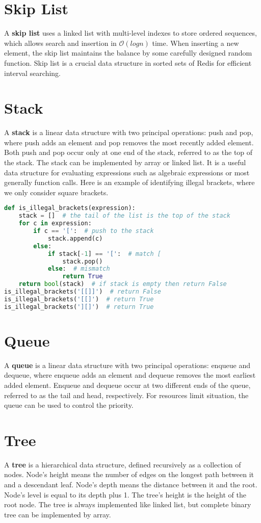 \documentclass[a4paper,11pt]{article}
\begin{document}
\section*{Skip List}
A \textbf{skip list} uses a linked list with multi-level indexes to store ordered sequences, which allows search and insertion in $\mathcal{O}(logn)$ time.
When inserting a new element, the skip list maintains the balance by some carefully designed random function.
Skip list is a crucial data structure in sorted sets of Redis for efficient interval searching.


\section*{Stack}
A \textbf{stack} is a linear data structure with two principal operations: push and pop,
where push adds an element and pop removes the most recently added element.
Both push and pop occur only at one end of the stack, referred to as the top of the stack.
The stack can be implemented by array or linked list. 
It is a useful data structure for evaluating expressions such as algebraic expressions or most generally function calls.
Here is an example of identifying illegal brackets, where we only consider square brackets.
\begin{lstlisting}[language=Python]
def is_illegal_brackets(expression):
    stack = []  # the tail of the list is the top of the stack
    for c in expression:
        if c == '[':  # push to the stack
            stack.append(c)
        else:
            if stack[-1] == '[':  # match [
                stack.pop()
            else:  # mismatch
                return True
    return bool(stack)  # if stack is empty then return False
is_illegal_brackets('[[]]')  # return False
is_illegal_brackets('[[]')  # return True
is_illegal_brackets('][]')  # return True
\end{lstlisting}


\section*{Queue}
A \textbf{queue} is a linear data structure with two principal operations: enqueue and dequeue,
where enqueue adds an element and dequeue removes the most earliest added element.
Enqueue and dequeue occur at two different ends of the queue, referred to as the tail and head, respectively.
For resources limit situation, the queue can be used to control the priority. 


\section*{Tree}
A \textbf{tree} is a hierarchical data structure, defined recursively as a collection of nodes.
Node's height means the number of edges on the longest path between it and a descendant leaf.
Node's depth means the distance between it and the root.
Node's level is equal to its depth plus 1.
The tree's height is the height of the root node.
The tree is always implemented like linked list, but complete binary tree can be implemented by array.
\end{document}
